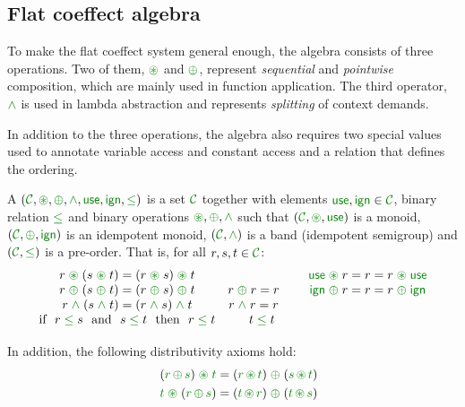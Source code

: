 
\subsection{Flat coeffect algebra}
\label{sec:flat-calculus-algebra}

To make the flat coeffect system general enough, the algebra consists of three operations.
Two of them, $\cseq$ and $\cpar$, represent \emph{sequential} and \emph{pointwise} composition,
which are mainly used in function application. The third operator, $\czip$ is used in lambda
abstraction and represents \emph{splitting} of context demands.

In addition to the three operations, the algebra also requires two special values used to annotate
variable access and constant access and a relation that defines the ordering.

\begin{definition}
A \emph{} $(\C, \cseq, \cpar, \czip, \cunit, \czero, \cleq)$ is a set
$\C$ together with elements $\cunit, \czero \in \C$, binary relation $\cleq$ and binary operations
$\cseq, \cpar, \czip$ such that $(\C, \cseq, \cunit)$ is a monoid, $(\C, \cpar, \czero)$ is an
idempotent monoid, $(\C, \czip)$ is a band (idempotent semigroup) and $(\C, \cleq)$ is a pre-order.
That is, for all $r,s,t\in \C$:
%
\begin{equation*}
\begin{array}{ccc}
r \;\cseq\; (s \;\cseq\; t) = (r \;\cseq\; s) \;\cseq\; t &&
\cunit \;\cseq\; r = r = r \;\cseq\; \cunit
\\
r \;\cpar\; (s \;\cpar\; t) = (r \;\cpar\; s) \;\cpar\; t &r\; \cpar\; r = r~~~~&
\czero \;\cpar\; r = r = r \;\cpar\; \czero
\\
r \;\czip\; (s \;\czip\; t) = (r \;\czip\; s) \;\czip\; t &r\; \czip\; r = r~~~~&~
\\
\textnormal{if}~~r\; \cleq\; s ~~\textnormal{and}~~s\; \cleq\; t~~\textnormal{then}~~r\; \cleq\; t &
t\; \cleq\; t \\[0.5em]
\end{array}
\end{equation*}
%
In addition, the following distributivity axioms hold:
\begin{align*}
\quad (\cclrd{r}\, \cpar\, \cclrd{s}) \;\cseq\; \cclrd{t} & = (\cclrd{r} \,\cseq\, \cclrd{t}) \;\cpar\; (\cclrd{s}\, \cseq\, \cclrd{t}) \\
\quad \cclrd{t} \;\cseq\; (\cclrd{r}\, \cpar\, \cclrd{s}) & = (\cclrd{t} \,\cseq\, \cclrd{r}) \;\cpar\; (\cclrd{t}\, \cseq\, \cclrd{s})
\end{align*}
\end{definition}

